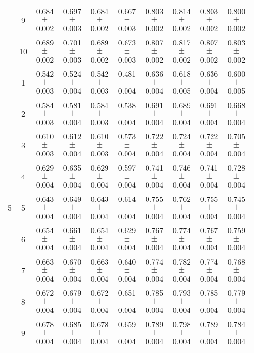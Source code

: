 \begin{table}[htbp]
{\begin{tabular}[]{c|c|cccc|cccc}
  & 9  & 0.684{\tiny$\pm$0.002} & 0.697{\tiny$\pm$0.003} & 0.684{\tiny$\pm$0.002} & 0.667{\tiny$\pm$0.003} & 0.803{\tiny$\pm$0.002} & 0.814{\tiny$\pm$0.002} & 0.803{\tiny$\pm$0.002} & 0.800{\tiny$\pm$0.002} \\
  & 10 & 0.689{\tiny$\pm$0.002} & 0.701{\tiny$\pm$0.003} & 0.689{\tiny$\pm$0.002} & 0.673{\tiny$\pm$0.003} & 0.807{\tiny$\pm$0.002} & 0.817{\tiny$\pm$0.002} & 0.807{\tiny$\pm$0.002} & 0.803{\tiny$\pm$0.002} \\
\midrule
\multirow{10}{*}{5} 
  & 1  & 0.542{\tiny$\pm$0.003} & 0.524{\tiny$\pm$0.004} & 0.542{\tiny$\pm$0.003} & 0.481{\tiny$\pm$0.004} & 0.636{\tiny$\pm$0.004} & 0.618{\tiny$\pm$0.005} & 0.636{\tiny$\pm$0.004} & 0.600{\tiny$\pm$0.005} \\
  & 2  & 0.584{\tiny$\pm$0.003} & 0.581{\tiny$\pm$0.004} & 0.584{\tiny$\pm$0.003} & 0.538{\tiny$\pm$0.004} & 0.691{\tiny$\pm$0.004} & 0.689{\tiny$\pm$0.004} & 0.691{\tiny$\pm$0.004} & 0.668{\tiny$\pm$0.004} \\
  & 3  & 0.610{\tiny$\pm$0.003} & 0.612{\tiny$\pm$0.004} & 0.610{\tiny$\pm$0.003} & 0.573{\tiny$\pm$0.004} & 0.722{\tiny$\pm$0.004} & 0.724{\tiny$\pm$0.004} & 0.722{\tiny$\pm$0.004} & 0.705{\tiny$\pm$0.004} \\
  & 4  & 0.629{\tiny$\pm$0.004} & 0.635{\tiny$\pm$0.004} & 0.629{\tiny$\pm$0.004} & 0.597{\tiny$\pm$0.004} & 0.741{\tiny$\pm$0.004} & 0.746{\tiny$\pm$0.004} & 0.741{\tiny$\pm$0.004} & 0.728{\tiny$\pm$0.004} \\
  & 5  & 0.643{\tiny$\pm$0.004} & 0.649{\tiny$\pm$0.004} & 0.643{\tiny$\pm$0.004} & 0.614{\tiny$\pm$0.004} & 0.755{\tiny$\pm$0.004} & 0.762{\tiny$\pm$0.004} & 0.755{\tiny$\pm$0.004} & 0.745{\tiny$\pm$0.004} \\
  & 6  & 0.654{\tiny$\pm$0.004} & 0.661{\tiny$\pm$0.004} & 0.654{\tiny$\pm$0.004} & 0.629{\tiny$\pm$0.004} & 0.767{\tiny$\pm$0.004} & 0.774{\tiny$\pm$0.004} & 0.767{\tiny$\pm$0.004} & 0.759{\tiny$\pm$0.004} \\
  & 7  & 0.663{\tiny$\pm$0.004} & 0.670{\tiny$\pm$0.004} & 0.663{\tiny$\pm$0.004} & 0.640{\tiny$\pm$0.004} & 0.774{\tiny$\pm$0.004} & 0.782{\tiny$\pm$0.004} & 0.774{\tiny$\pm$0.004} & 0.768{\tiny$\pm$0.004} \\
  & 8  & 0.672{\tiny$\pm$0.004} & 0.679{\tiny$\pm$0.004} & 0.672{\tiny$\pm$0.004} & 0.651{\tiny$\pm$0.004} & 0.785{\tiny$\pm$0.004} & 0.793{\tiny$\pm$0.004} & 0.785{\tiny$\pm$0.004} & 0.779{\tiny$\pm$0.004} \\
  & 9  & 0.678{\tiny$\pm$0.004} & 0.685{\tiny$\pm$0.004} & 0.678{\tiny$\pm$0.004} & 0.659{\tiny$\pm$0.004} & 0.789{\tiny$\pm$0.004} & 0.798{\tiny$\pm$0.004} & 0.789{\tiny$\pm$0.004} & 0.784{\tiny$\pm$0.004} \\

\end{tabular}}
\end{table}
